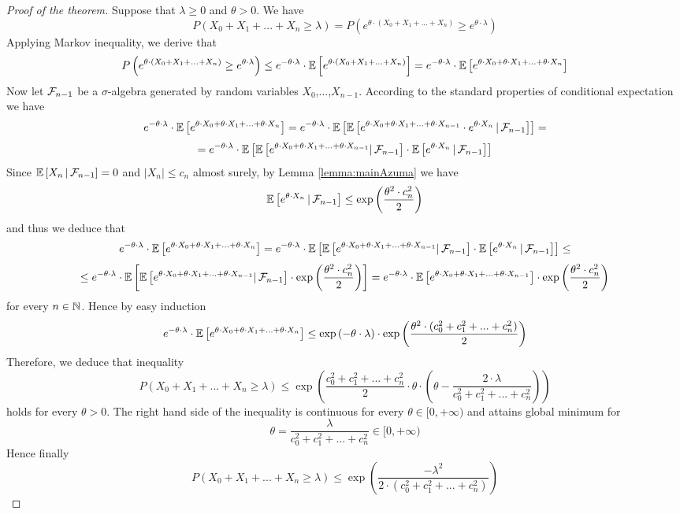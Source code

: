 \begin{proof}[Proof of the theorem]
Suppose that $\lambda \geq 0$ and $\theta > 0$. We have
$$P\left(X_0+X_1+...+X_n\geq \lambda\right) = P\left(e^{\theta \cdot \left(X_0+X_1+...+X_n\right)}\geq e^{\theta \cdot \lambda}\right)$$
Applying Markov inequality, we derive that
$$P\left(e^{\theta \cdot \left(X_0+X_1+...+X_n\right)}\geq e^{\theta \cdot \lambda}\right)\leq e^{-\theta\cdot \lambda}\cdot {\mathbb E} \left[e^{\theta \cdot \left(X_0+X_1+...+X_n\right)}\right] = e^{-\theta\cdot \lambda}\cdot {\mathbb E}\left[e^{\theta \cdot X_0+\theta \cdot X_1+...+\theta \cdot X_n}\right]$$
Now let ${\mathcal F}_{n-1}$ be a $\sigma$-algebra generated by random variables $X_0$,...,$X_{n-1}$. According to the standard properties of conditional expectation we have
$$e^{-\theta\cdot \lambda}\cdot {\mathbb E}\left[e^{\theta \cdot X_0+\theta \cdot X_1+...+\theta \cdot X_n}\right] = e^{-\theta\cdot \lambda}\cdot {\mathbb E}\left[{\mathbb E}\left[e^{\theta \cdot X_0+\theta \cdot X_1+...+\theta \cdot X_{n-1}}\cdot e^{\theta \cdot X_n}\,|\,{\mathcal F}_{n-1}\right]\right]=$$
$$=e^{-\theta\cdot \lambda}\cdot {\mathbb E}\left[{\mathbb E}\left[e^{\theta \cdot X_0+\theta \cdot X_1+...+\theta \cdot X_{n-1}}|\,{\mathcal F}_{n-1}\right] \cdot {\mathbb E}\left[ e^{\theta \cdot X_n}\,|\,{\mathcal F}_{n-1}\right]\right]$$
Since ${\mathbb E}\left[X_n\,|\,{\mathcal F}_{n-1}\right] = 0$ and $|X_n|\leq c_n$ almost surely, by Lemma \ref{lemma:mainAzuma} we have
$${\mathbb E}\left[ e^{\theta \cdot X_n}\,|\,{\mathcal F}_{n-1}\right] \leq  \exp\left(\frac{\theta^2\cdot c_n^2}{2}\right)$$
and thus we deduce that
$$e^{-\theta\cdot \lambda}\cdot {\mathbb E}\left[e^{\theta \cdot X_0+\theta \cdot X_1+...+\theta \cdot X_n}\right] = e^{-\theta\cdot \lambda}\cdot {\mathbb E}\left[{\mathbb E}\left[e^{\theta \cdot X_0+\theta \cdot X_1+...+\theta \cdot X_{n-1}}|\,{\mathcal F}_{n-1}\right] \cdot {\mathbb E}\left[ e^{\theta \cdot X_n}\,|\,{\mathcal F}_{n-1}\right]\right] \leq$$
$$\leq  e^{-\theta\cdot \lambda}\cdot {\mathbb E}\left[{\mathbb E}\left[e^{\theta \cdot X_0+\theta \cdot X_1+...+\theta \cdot X_{n-1}}|\,{\mathcal F}_{n-1}\right] \cdot \exp\left(\frac{\theta^2\cdot c_n^2}{2}\right)\right]=e^{-\theta\cdot \lambda}\cdot {\mathbb E} \left[e^{\theta \cdot X_0+\theta \cdot X_1+...+\theta \cdot X_{n-1}}\right] \cdot \exp\left(\frac{\theta^2\cdot c_n^2}{2}\right)$$
for every $n\in {\mathbb N}$. Hence by easy induction
$$e^{-\theta\cdot \lambda}\cdot {\mathbb E}\left[e^{\theta \cdot X_0+\theta \cdot X_1+...+\theta \cdot X_n}\right]\leq \exp\left(-\theta \cdot \lambda\right)\cdot \exp\left(\frac{\theta^2\cdot (c_0^2+c_1^2+...+c_n^2)}{2}\right)$$
Therefore, we deduce that inequality
$$P\left(X_0+X_1+...+X_n\geq \lambda\right)\leq \exp\left(\frac{c_0^2+c_1^2+...+c_n^2}{2}\cdot \theta \cdot \left(\theta - \frac{2\cdot \lambda}{c_0^2+c_1^2+...+c_n^2} \right)\right)$$
holds for every $\theta>0$. The right hand side of the inequality is continuous for every $\theta \in [0,+\infty)$ and attains global minimum for 
$$\theta = \frac{\lambda}{c_0^2+c_1^2+...+c_n^2}\in [0,+\infty)$$
Hence finally 
$$P\left(X_0+X_1+...+X_n\geq \lambda\right)\leq  \exp\left(\frac{-\lambda^2}{2\cdot \left(c_0^2+c_1^2+...+c^2_n\right)}\right)$$
\end{proof}

